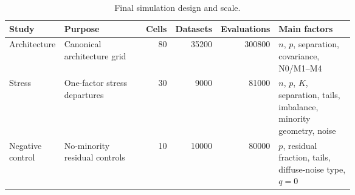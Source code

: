 \begin{table}[!htbp]
\caption{Final simulation design and scale.}
\label{tab:simulation-design}
\centering
\scriptsize
\setlength{\tabcolsep}{2pt}
\begin{tabular}{p{0.16\linewidth}p{0.26\linewidth}rrrp{0.24\linewidth}}
\hline
Study & Purpose & Cells & Datasets & Evaluations & Main factors \\
\hline
Architecture & Canonical architecture grid & 80 & 35200 & 300800 & $n$, $p$, separation, covariance, N0/M1--M4 \\
Stress & One-factor stress departures & 30 &  9000 &  81000 & $n$, $p$, $K$, separation, tails, imbalance, minority geometry, noise \\
Negative control & No-minority residual controls & 10 & 10000 &  80000 & $p$, residual fraction, tails, diffuse-noise type, $q=0$ \\
\hline
\end{tabular}
\end{table}
